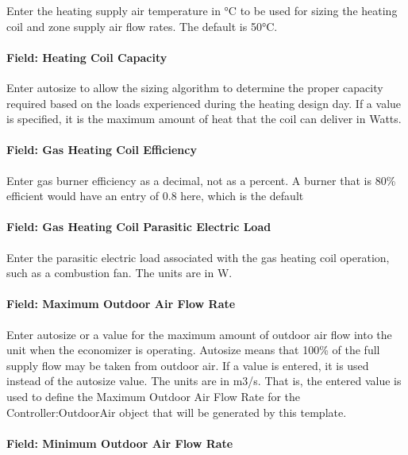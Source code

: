 Enter the heating supply air temperature in °C to be used for sizing the heating coil and zone supply air flow rates. The default is 50°C.

\paragraph{Field: Heating Coil Capacity}\label{field-heating-coil-capacity-1}

Enter autosize to allow the sizing algorithm to determine the proper capacity required based on the loads experienced during the heating design day. If a value is specified, it is the maximum amount of heat that the coil can deliver in Watts.

\paragraph{Field: Gas Heating Coil Efficiency}\label{field-gas-heating-coil-efficiency-1}

Enter gas burner efficiency as a decimal, not as a percent. A burner that is 80\% efficient would have an entry of 0.8 here, which is the default

\paragraph{Field: Gas Heating Coil Parasitic Electric Load}\label{field-gas-heating-coil-parasitic-electric-load-1}

Enter the parasitic electric load associated with the gas heating coil operation, such as a combustion fan. The units are in W.

\paragraph{Field: Maximum Outdoor Air Flow Rate}\label{field-maximum-outdoor-air-flow-rate-000}

Enter autosize or a value for the maximum amount of outdoor air flow into the unit when the economizer is operating. Autosize means that 100\% of the full supply flow may be taken from outdoor air. If a value is entered, it is used instead of the autosize value. The units are in m3/s. That is, the entered value is used to define the Maximum Outdoor Air Flow Rate for the Controller:OutdoorAir object that will be generated by this template.

\paragraph{Field: Minimum Outdoor Air Flow Rate}\label{field-minimum-outdoor-air-flow-rate-000}

